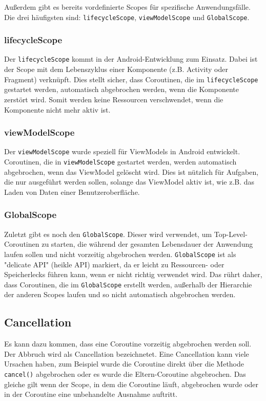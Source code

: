 \documentclass[fontsize=12pt,paper=a4,twoside=semi,parskip=half-,headsepline,headinclude]{scrreprt}
\begin{document}
Außerdem gibt es bereits vordefinierte Scopes für spezifische Anwendungsfälle. Die drei häufigsten sind: \texttt{lifecycleScope}, \texttt{viewModelScope} und \texttt{GlobalScope}.

\subsubsection{lifecycleScope}

Der \texttt{lifecycleScope} kommt in der Android-Entwicklung zum Einsatz. Dabei ist der Scope mit dem Lebenszyklus einer Komponente (z.B. Activity oder Fragment) verknüpft. Dies stellt sicher, dass Coroutinen, die im \texttt{lifecycleScope} gestartet werden, automatisch abgebrochen werden, wenn die Komponente zerstört wird. Somit werden keine Ressourcen verschwendet, wenn die Komponente nicht mehr aktiv ist.

\subsubsection{viewModelScope}

Der \texttt{viewModelScope} wurde speziell für ViewModels in Android entwickelt. Coroutinen, die in \texttt{viewModelScope} gestartet werden, werden automatisch abgebrochen, wenn das ViewModel gelöscht wird. Dies ist nützlich für Aufgaben, die nur ausgeführt werden sollen, solange das ViewModel aktiv ist, wie z.B. das Laden von Daten einer Benutzeroberfläche.

\subsubsection{GlobalScope}

Zuletzt gibt es noch den \texttt{GlobalScope}. Dieser wird verwendet, um Top-Level-Coroutinen zu starten, die während der gesamten Lebensdauer der Anwendung laufen sollen und nicht vorzeitig abgebrochen werden. \texttt{GlobalScope} ist als "delicate API" (heikle API) markiert, da er leicht zu Ressourcen- oder Speicherlecks führen kann, wenn er nicht richtig verwendet wird. Das rührt daher, dass Coroutinen, die im \texttt{GlobalScope} erstellt werden, außerhalb der Hierarchie der anderen Scopes laufen und so nicht automatisch abgebrochen werden.

\subsection{Cancellation}

Es kann dazu kommen, dass eine Coroutine vorzeitig abgebrochen werden soll. Der Abbruch wird als Cancellation bezeichnetet. Eine Cancellation kann viele Ursachen haben, zum Beispiel wurde die Coroutine direkt über die Methode \texttt{cancel()} abgebrochen oder es wurde die Eltern-Coroutine abgebrochen. Das gleiche gilt wenn der Scope, in dem die Coroutine läuft, abgebrochen wurde oder in der Coroutine eine unbehandelte Ausnahme auftritt.
\end{document}
